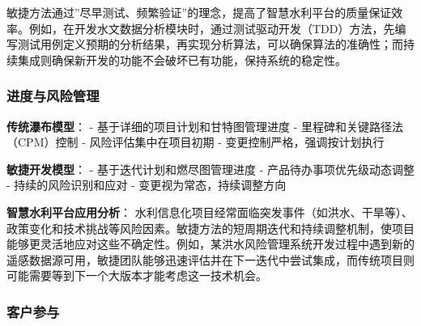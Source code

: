 敏捷方法通过''尽早测试、频繁验证''的理念，提高了智慧水利平台的质量保证效率。例如，在开发水文数据分析模块时，通过测试驱动开发（TDD）方法，先编写测试用例定义预期的分析结果，再实现分析算法，可以确保算法的准确性；而持续集成则确保新开发的功能不会破坏已有功能，保持系统的稳定性。

\subsubsection{进度与风险管理}\label{ux8fdbux5ea6ux4e0eux98ceux9669ux7ba1ux7406}

\textbf{传统瀑布模型}： - 基于详细的项目计划和甘特图管理进度 -
里程碑和关键路径法（CPM）控制 - 风险评估集中在项目初期 -
变更控制严格，强调按计划执行

\textbf{敏捷开发模型}： - 基于迭代计划和燃尽图管理进度 -
产品待办事项优先级动态调整 - 持续的风险识别和应对 -
变更视为常态，持续调整方向

\textbf{智慧水利平台应用分析}：
水利信息化项目经常面临突发事件（如洪水、干旱等）、政策变化和技术挑战等风险因素。敏捷方法的短周期迭代和持续调整机制，使项目能够更灵活地应对这些不确定性。例如，某洪水风险管理系统开发过程中遇到新的遥感数据源可用，敏捷团队能够迅速评估并在下一迭代中尝试集成，而传统项目则可能需要等到下一个大版本才能考虑这一技术机会。

\subsubsection{客户参与}\label{ux5ba2ux6237ux53c2ux4e0e}

